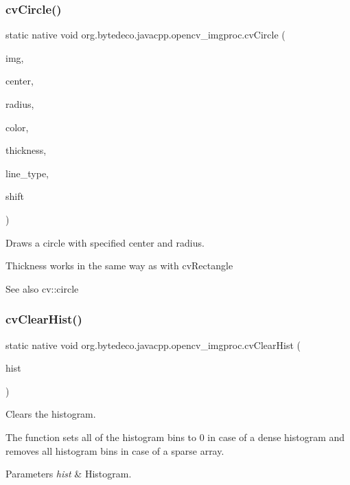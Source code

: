 \subsubsection{\texorpdfstring{cv\+Circle()}{cvCircle()}}
{\footnotesize\ttfamily static native void org.\+bytedeco.\+javacpp.\+opencv\+\_\+imgproc.\+cv\+Circle (\begin{DoxyParamCaption}\item[{Cv\+Arr}]{img,  }\item[{@By\+Val Cv\+Point}]{center,  }\item[{int}]{radius,  }\item[{@By\+Val Cv\+Scalar}]{color,  }\item[{int}]{thickness,  }\item[{int}]{line\+\_\+type,  }\item[{int}]{shift }\end{DoxyParamCaption})\hspace{0.3cm}{\ttfamily [static]}}



Draws a circle with specified center and radius. 

Thickness works in the same way as with cv\+Rectangle \begin{DoxySeeAlso}{See also}
cv\+::circle 
\end{DoxySeeAlso}
\mbox{\label{group__imgproc__c_ga9591f26ede9fd9b7c61d24dc2016cfc9}} 
\subsubsection{\texorpdfstring{cv\+Clear\+Hist()}{cvClearHist()}}
{\footnotesize\ttfamily static native void org.\+bytedeco.\+javacpp.\+opencv\+\_\+imgproc.\+cv\+Clear\+Hist (\begin{DoxyParamCaption}\item[{Cv\+Histogram}]{hist }\end{DoxyParamCaption})\hspace{0.3cm}{\ttfamily [static]}}



Clears the histogram. 

The function sets all of the histogram bins to 0 in case of a dense histogram and removes all histogram bins in case of a sparse array. 


\begin{DoxyParams}{Parameters}
{\em hist} & Histogram. \\
\hline
\end{DoxyParams}
\mbox{\label{group__imgproc__c_ga1bff7c65c8a997286cfb28f978c3d9f4}} 

